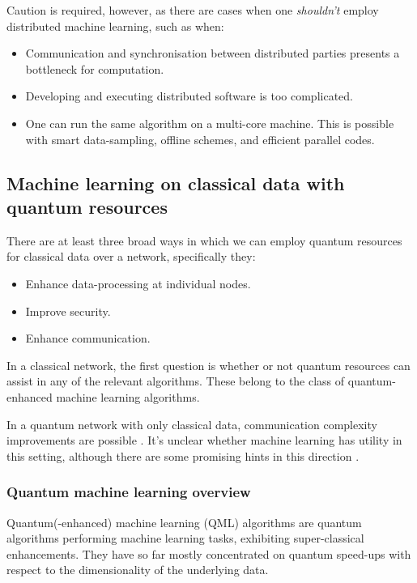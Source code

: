 Caution is required, however, as there are cases when one \textit{shouldn't} employ distributed machine learning, such as when:
\begin{itemize}
\item Communication and synchronisation between distributed parties presents a bottleneck for computation.
\item Developing and executing distributed software is too complicated.
\item One can run the same algorithm on a multi-core machine. This is possible with smart data-sampling, offline schemes, and efficient parallel codes.
\end{itemize}

\subsection{Machine learning on classical data with quantum resources}

There are at least three broad ways in which we can employ quantum resources for classical data over a network, specifically they:
\begin{itemize}
\item Enhance data-processing at individual nodes.
\item Improve security.
\item Enhance communication.
\end{itemize}

In a classical network, the first question is whether or not quantum resources can assist in any of the relevant algorithms. These belong to the class of quantum-enhanced machine learning algorithms.

In a quantum network with only classical data, communication complexity improvements are possible \cite{bib:brassard2003quantum}. It's unclear whether machine learning has utility in this setting, although there are some promising hints in this direction \cite{bib:kane2017communication, bib:balcan2012distributed, bib:conitzer2004communication}.

\subsubsection{Quantum machine learning overview}

Quantum(-enhanced) machine learning (QML) algorithms are quantum algorithms performing machine learning tasks, exhibiting super-classical enhancements. They have so far mostly concentrated on quantum speed-ups with respect to the dimensionality of the underlying data.

